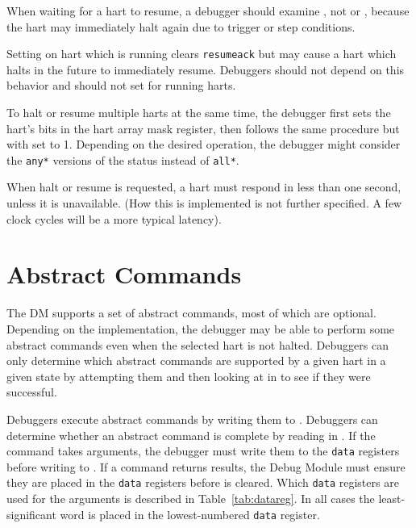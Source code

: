\begin{commentary}
  When waiting for a hart to resume, a debugger should
  examine \Fallresumeack, not \Fallrunning
  or \Fallhalted,
  because the hart may immediately halt again due to
  trigger or step conditions.
\end{commentary}

Setting \Fresumereq on hart which is running
clears {\tt resumeack} but
may cause a hart which halts in the future to immediately
resume. Debuggers should not depend on this behavior and should not
set \Fresumereq for running harts.

To halt or resume multiple harts at the same time, the debugger first
sets the hart's bits in the hart array mask register, then
follows the same procedure but with \Fhasel set to 1.
Depending on the desired operation, the debugger might consider the {\tt any*}
versions of the status instead of {\tt all*}.

When halt or resume is requested, a hart must respond in
less than one second, unless it is unavailable.
(How this is implemented is not further specified. A few
clock cycles will be a more typical latency).

\section{Abstract Commands} \label{abstractcommands}

The DM supports a set of abstract commands, most of which
are optional. Depending on the implementation, the debugger may
be able to perform
some abstract commands even when the selected hart is not halted.
Debuggers can only determine which abstract commands
are supported by a given hart in a given state by attempting them
and then looking at \Fcmderr in \Rabstractcs to see if they were successful.

Debuggers execute abstract commands by writing them to \Rcommand.
Debuggers can determine whether an abstract command is complete by
reading \Fbusy in \Rabstractcs.
If the command takes arguments, the debugger
must write them to the {\tt data} registers before writing to \Rcommand. If a
command returns results, the Debug Module must ensure they are placed
in the {\tt data} registers before \Fbusy is cleared.
Which {\tt data} registers are used for the arguments is
described in Table~\ref{tab:datareg}.  In all cases the least-significant word
is placed in the lowest-numbered {\tt data} register.

